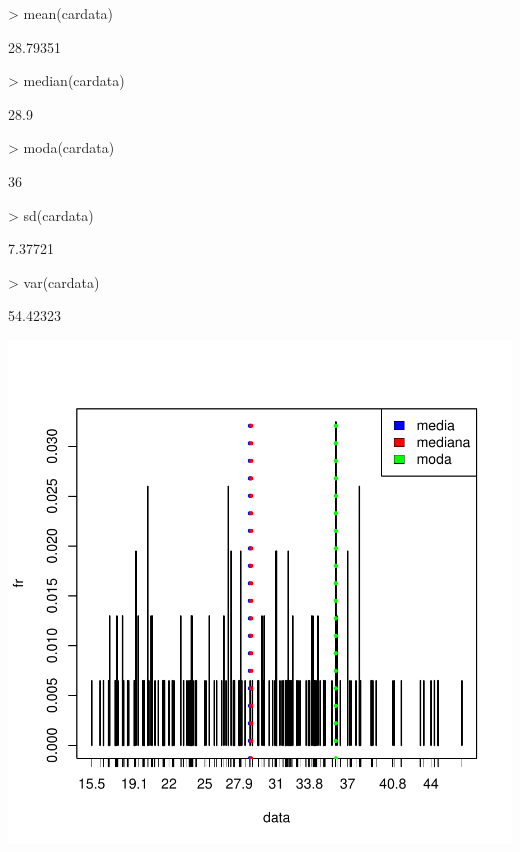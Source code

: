 \documentclass [a4paper] {article}
\begin{document}
\begin{Schunk}
\end{Schunk}

\begin{Schunk}
\begin{Sinput}
> mean(cardata)
\end{Sinput}
\begin{Soutput}
[1] 28.79351
\end{Soutput}
\begin{Sinput}
> median(cardata)
\end{Sinput}
\begin{Soutput}
[1] 28.9
\end{Soutput}
\begin{Sinput}
> moda(cardata)
\end{Sinput}
\begin{Soutput}
[1] 36
\end{Soutput}
\begin{Sinput}
> sd(cardata)
\end{Sinput}
\begin{Soutput}
[1] 7.37721
\end{Soutput}
\begin{Sinput}
> var(cardata)
\end{Sinput}
\begin{Soutput}
[1] 54.42323
\end{Soutput}
\end{Schunk}
\begin{center}
\includegraphics{entrega-018}
\end{center}
\end{document}
